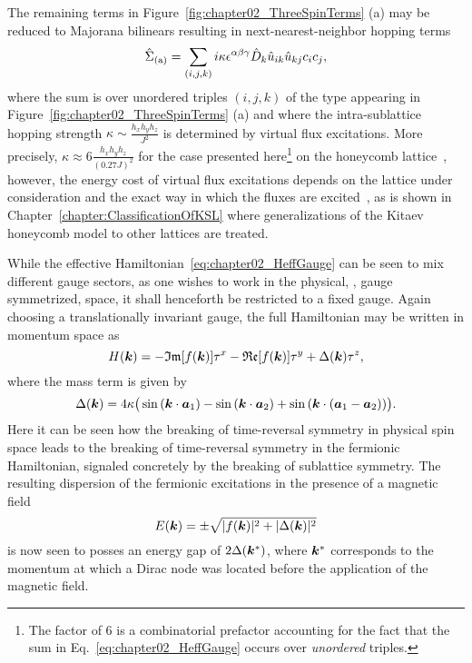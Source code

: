 The remaining terms in Figure~\ref{fig:chapter02_ThreeSpinTerms} (a) may be reduced to Majorana bilinears resulting in next-nearest-neighbor hopping terms
%
\begin{equation}
	\hat{\Sigma}_{\rm (a)} = \sum_{(i,j,k)} i \kappa \epsilon^{\alpha\beta\gamma} \hat{D}_k \hat{u}_{ik} \hat{u}_{kj} c_i c_j,
	\label{eq:chapter02_HeffGauge}
\end{equation}
%
where the sum is over unordered triples $(i,j,k)$ of the type appearing in Figure~\ref{fig:chapter02_ThreeSpinTerms} (a) and where the intra-sublattice hopping strength $\kappa \sim \frac{h_x h_y h_z}{J^2}$ is determined by virtual flux excitations.
More precisely, $\kappa \approx 6\frac{h_x h_y h_z}{(0.27 J)^2}$ for the case presented here\footnote{The factor of $6$ is a combinatorial prefactor accounting for the fact that the sum in Eq.~\eqref{eq:chapter02_HeffGauge} occurs over \textit{unordered} triples.} on the honeycomb lattice~\cite{KitaevAoP2006}, however, the energy cost of virtual flux excitations depends on the lattice under consideration and the exact way in which the fluxes are excited~\cite{OBrienPRB2016}, as is shown in Chapter~\ref{chapter:ClassificationOfKSL} where generalizations of the Kitaev honeycomb model to other lattices are treated.

While the effective Hamiltonian~\eqref{eq:chapter02_HeffGauge} can be seen to mix different gauge sectors, as one wishes to work in the physical, \ie, gauge symmetrized, space, it shall henceforth be restricted to a fixed gauge.
Again choosing a translationally invariant gauge, the full Hamiltonian may be written in momentum space as
%
\begin{equation}
	H(\bm{k}) = -\mathfrak{Im}[f(\bm{k})] \tau^x - \mathfrak{Re}[f(\bm{k})] \tau^y + \Delta(\bm{k}) \tau^z,
	\label{eq:chapter02_KitaevHamiltonianMagnetic}
\end{equation}
%
where the mass term is given by
%
\begin{equation}
	\Delta(\bm{k}) = 4\kappa \big(\sin{(\bm{k}\cdot \bm{a}_1)} - \sin{(\bm{k}\cdot \bm{a}_2)} + \sin{(\bm{k}\cdot (\bm{a}_1 - \bm{a}_2))}\big).
\end{equation}
%
Here it can be seen how the breaking of time-reversal symmetry in physical spin space leads to the breaking of time-reversal symmetry in the fermionic Hamiltonian, signaled concretely by the breaking of sublattice symmetry.
The resulting dispersion of the fermionic excitations in the presence of a magnetic field
%
\begin{equation}
	E(\bm{k}) = \pm \sqrt{|f(\bm{k})|^2 + |\Delta(\bm{k})|^2}
\end{equation}
%
is now seen to posses an energy gap of $2\Delta(\bm{k}^*)$, where $\bm{k}^*$ corresponds to the momentum at which a Dirac node was located before the application of the magnetic field.


